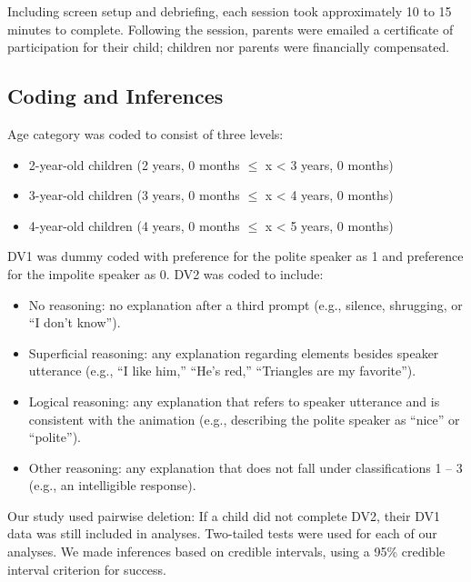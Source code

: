 \documentclass[
  english,
  man,floatsintext]{apa6}
\begin{document}
Including screen setup and debriefing, each session took approximately 10 to 15 minutes to complete. Following the session, parents were emailed a certificate of participation for their child; children nor parents were financially compensated.

\hypertarget{coding-and-inferences}{%
\subsection{Coding and Inferences}\label{coding-and-inferences}}

Age category was coded to consist of three levels:

\begin{itemize}
\item
  2-year-old children (2 years, 0 months \(\leqslant\) x \textless{} 3 years, 0 months)
\item
  3-year-old children (3 years, 0 months \(\leqslant\) x \textless{} 4 years, 0 months)
\item
  4-year-old children (4 years, 0 months \(\leqslant\) x \textless{} 5 years, 0 months)
\end{itemize}

DV1 was dummy coded with preference for the polite speaker as 1 and preference for the impolite speaker as 0. DV2 was coded to include:

\begin{itemize}
\item
  No reasoning: no explanation after a third prompt (e.g., silence, shrugging, or ``I don't know'').
\item
  Superficial reasoning: any explanation regarding elements besides speaker utterance (e.g., ``I like him,'' ``He's red,'' ``Triangles are my favorite'').
\item
  Logical reasoning: any explanation that refers to speaker utterance and is consistent with the animation (e.g., describing the polite speaker as ``nice'' or ``polite'').
\item
  Other reasoning: any explanation that does not fall under classifications 1 -- 3 (e.g., an intelligible response).
\end{itemize}

Our study used pairwise deletion: If a child did not complete DV2, their DV1 data was still included in analyses. Two-tailed tests were used for each of our analyses. We made inferences based on credible intervals, using a 95\% credible interval criterion for success.
\end{document}
